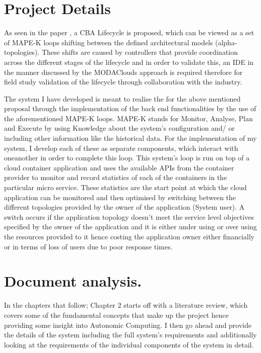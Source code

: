 \section{Project Details}

As seen in the paper \cite{andrikopoulos2017engineering}, a CBA Lifecycle is proposed, which can be viewed as a set of MAPE-K loops \cite{kephart2003vision} shifting between the defined architectural models (alpha-topologies). These shifts are caused by controllers that provide coordination across the different stages of the lifecycle and in order to validate this, an IDE in the manner discussed by the MODAClouds approach \cite{ardagna2012modaclouds} is required therefore for field study validation of the lifecycle through collaboration with the industry.

The system I have developed is meant to realise the for the above mentioned proposal through the implementation of the back end functionalities by the use of the aforementioned MAPE-K loops. MAPE-K stands for Monitor, Analyse, Plan and Execute by using Knowledge about the system's configuration and/ or including other information like the historical data. For the implementation of my system, I develop each of these as separate components, which interact with oneanother in order to complete this loop. This system's loop is run on top of a cloud container application and uses the available APIs from the container provider to monitor and record statistics of each of the containers in the particular micro service. These statistics are the start point at which the cloud application can be monitored and then optimised by switching between the different topologies provided by the owner of the application (System user). A switch occurs if the application topology doesn't meet the service level objectives specified by the owner of the application and it is either under using or over using the resources provided to it hence costing the application owner either financially or in terms of loss of users due to poor response times.



\section{Document analysis.}\label{sec:issues}
In the chapters that follow; Chapter 2 starts off with a literature review, which covers some of the fundamental concepts that make up the project hence providing some insight into Autonomic Computing. I then go ahead and provide the details of the system including the full system's requirements and additionally looking at the requirements of the individual components of the system in detail. 

